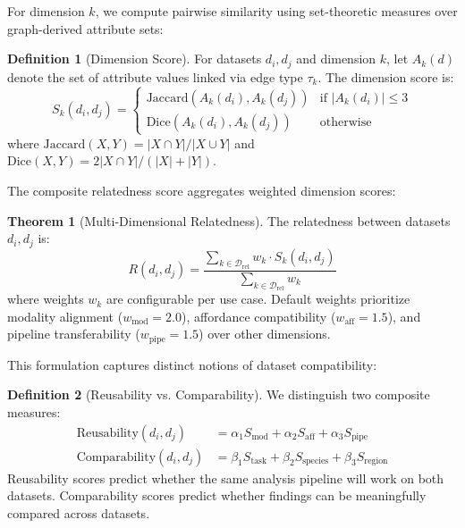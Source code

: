\documentclass{article}
\theoremstyle{definition}
\newtheorem{definition}{Definition}[section]
\newtheorem{theorem}{Theorem}[section]
\begin{document}
For dimension $k$, we compute pairwise similarity using set-theoretic measures over graph-derived attribute sets:

\begin{definition}[Dimension Score]
\label{def:dimension-score}
For datasets $d_i, d_j$ and dimension $k$, let $A_k(d)$ denote the set of attribute values linked via edge type $\tau_k$. The dimension score is:
\begin{equation}
S_k(d_i, d_j) = \begin{cases}
\text{Jaccard}(A_k(d_i), A_k(d_j)) & \text{if } |A_k(d_i)| \leq 3 \\[6pt]
\text{Dice}(A_k(d_i), A_k(d_j)) & \text{otherwise}
\end{cases}
\end{equation}
where $\text{Jaccard}(X, Y) = |X \cap Y| / |X \cup Y|$ and $\text{Dice}(X, Y) = 2|X \cap Y| / (|X| + |Y|)$.
\end{definition}

The composite relatedness score aggregates weighted dimension scores:

\begin{theorem}[Multi-Dimensional Relatedness]
\label{thm:relatedness}
The relatedness between datasets $d_i, d_j$ is:
\begin{equation}
R(d_i, d_j) = \frac{\sum_{k \in \mathcal{D}_{\text{rel}}} w_k \cdot S_k(d_i, d_j)}{\sum_{k \in \mathcal{D}_{\text{rel}}} w_k}
\end{equation}
where weights $w_k$ are configurable per use case. Default weights prioritize modality alignment ($w_{\text{mod}}=2.0$), affordance compatibility ($w_{\text{aff}}=1.5$), and pipeline transferability ($w_{\text{pipe}}=1.5$) over other dimensions.
\end{theorem}

This formulation captures distinct notions of dataset compatibility:

\begin{definition}[Reusability vs. Comparability]
\label{def:reuse-compare}
We distinguish two composite measures:
\begin{align}
\text{Reusability}(d_i, d_j) &= \alpha_1 S_{\text{mod}} + \alpha_2 S_{\text{aff}} + \alpha_3 S_{\text{pipe}} \\
\text{Comparability}(d_i, d_j) &= \beta_1 S_{\text{task}} + \beta_2 S_{\text{species}} + \beta_3 S_{\text{region}}
\end{align}
Reusability scores predict whether the same analysis pipeline will work on both datasets. Comparability scores predict whether findings can be meaningfully compared across datasets.
\end{definition}
\end{document}
